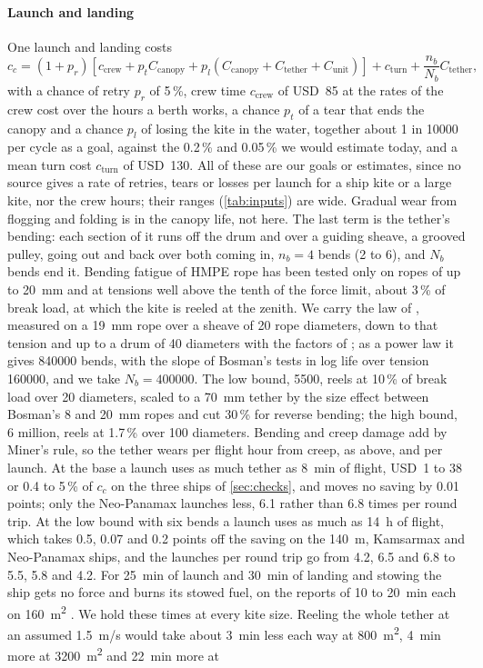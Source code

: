 \paragraph{Launch and landing} One launch and landing costs
\begin{equation}
c_c = (1+p_r)\left[c_\mathrm{crew} + p_t C_\mathrm{canopy} + p_l (C_\mathrm{canopy} + C_\mathrm{tether} + C_\mathrm{unit})\right] + c_\mathrm{turn} + \frac{n_b}{N_b} C_\mathrm{tether},
\label{eq:cycle_cost}
\end{equation}
with a chance of retry $p_r$ of 5\,\%, crew time $c_\mathrm{crew}$ of USD~85 at the rates of the crew cost over the hours a berth works, a chance $p_t$ of a tear that ends the canopy and a chance $p_l$ of losing the kite in the water, together about 1 in \num{10000} per cycle as a goal, against the 0.2\,\% and 0.05\,\% we would estimate today, and a mean turn cost $c_\mathrm{turn}$ of USD~130. All of these are our goals or estimates, since no source gives a rate of retries, tears or losses per launch for a ship kite or a large kite, nor the crew hours; their ranges (\cref{tab:inputs}) are wide. Gradual wear from flogging and folding is in the canopy life, not here. The last term is the tether's bending: each section of it runs off the drum and over a guiding sheave, a grooved pulley, going out and back over both coming in, $n_b=4$ bends (2 to 6), and $N_b$ bends end it. Bending fatigue of HMPE rope has been tested only on ropes of up to \SI{20}{mm} and at tensions well above the tenth of the force limit, about 3\,\% of break load, at which the kite is reeled at the zenith. We carry the law of \citet{davies2015}, measured on a \SI{19}{mm} rope over a sheave of 20 rope diameters, down to that tension and up to a drum of 40 diameters with the factors of \citet{bosman2013}; as a power law it gives \num{840000} bends, with the slope of Bosman's tests in log life over tension \num{160000}, and we take $N_b=\num{400000}$. The low bound, \num{5500}, reels at 10\,\% of break load over 20 diameters, scaled to a \SI{70}{mm} tether by the size effect between Bosman's 8 and \SI{20}{mm} ropes and cut 30\,\% for reverse bending; the high bound, \num{6} million, reels at 1.7\,\% over 100 diameters. Bending and creep damage add by Miner's rule, so the tether wears per flight hour from creep, as above, and per launch. At the base a launch uses as much tether as \SI{8}{min} of flight, USD~1 to 38 or 0.4 to 5\,\% of $c_c$ on the three ships of \cref{sec:checks}, and moves no saving by 0.01 points; only the Neo-Panamax launches less, 6.1 rather than 6.8 times per round trip. At the low bound with six bends a launch uses as much as \SI{14}{h} of flight, which takes 0.5, 0.07 and 0.2 points off the saving on the \SI{140}{m}, Kamsarmax and Neo-Panamax ships, and the launches per round trip go from 4.2, 6.5 and 6.8 to 5.5, 5.8 and 4.2. For \SI{25}{min} of launch and \SI{30}{min} of landing and stowing the ship gets no force and burns its stowed fuel, on the reports of 10 to \SI{20}{min} each on \SI{160}{m^2} \citep{konstruktionspraxis_skysails}. We hold these times at every kite size. Reeling the whole tether at an assumed \SI{1.5}{m/s} would take about \SI{3}{min} less each way at \SI{800}{m^2}, \SI{4}{min} more at \SI{3200}{m^2} and \SI{22}{min} more at 